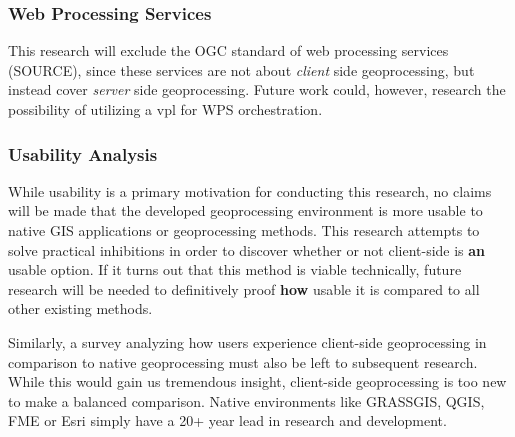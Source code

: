 \subsubsection*{Web Processing Services} %

This research will exclude the OGC standard of web processing services (SOURCE), since these services are not about \emph{client} side geoprocessing, but instead cover \emph{server} side geoprocessing. 
Future work could, however, research the possibility of utilizing a vpl for WPS orchestration. 



\subsubsection*{Usability Analysis} %

While usability is a primary motivation for conducting this research, no claims will be made that the developed geoprocessing environment is more usable to native GIS applications or geoprocessing methods. This research attempts to solve practical inhibitions in order to discover whether or not client-side is \textbf{an} usable option. If it turns out that this method is viable technically, future research will be needed to definitively proof \textbf{how} usable it is compared to all other existing methods.  


Similarly, a survey analyzing how users experience client-side geoprocessing in comparison to native geoprocessing must also be left to subsequent research. While this would gain us tremendous insight, client-side geoprocessing is too new to make a balanced comparison. Native environments like GRASSGIS, QGIS, FME or Esri simply have a 20+ year lead in research and development. 
